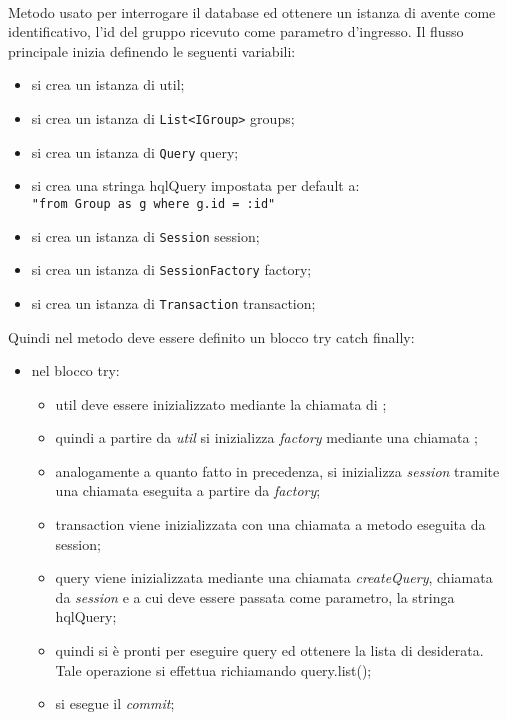 \begin{description}
	\item{}\\
	Metodo usato per interrogare il database ed ottenere un istanza di  avente come identificativo, l'id del gruppo ricevuto come parametro d'ingresso. Il flusso principale inizia definendo le seguenti variabili:
	\begin{itemize}
		\item si crea un istanza di  util;
		\item si crea un istanza di \texttt{List<IGroup>} groups;
		\item si crea un istanza di \texttt{Query} query;
		\item si crea una stringa hqlQuery impostata per default a:\\
			\verb|"from Group as g where g.id = :id"|
		\item si crea un istanza di \texttt{Session} session;
		\item si crea un istanza di \texttt{SessionFactory} factory;
		\item si crea un istanza di \texttt{Transaction} transaction;
	\end{itemize}
	Quindi nel metodo deve essere definito un blocco try catch finally:
	\begin{itemize}
		\item nel blocco try:
		\begin{itemize}
			\item util deve essere inizializzato mediante la chiamata  di ;
			\item quindi a partire da \textit{util} si inizializza \textit{factory} mediante una chiamata ;
			\item analogamente a quanto fatto in precedenza, si inizializza \textit{session} tramite una chiamata  eseguita a partire da \textit{factory};
			\item transaction viene inizializzata con una chiamata a metodo  eseguita da session;
			\item query viene inizializzata mediante una chiamata \textit{createQuery}, chiamata da \textit{session} e a cui deve essere passata come parametro, la stringa hqlQuery;
			\item quindi si è pronti per eseguire query ed ottenere la lista di  desiderata. Tale operazione si effettua richiamando query.list();
			\item si esegue il \textit{commit};

\end{itemize}
\end{itemize}
\end{description}
